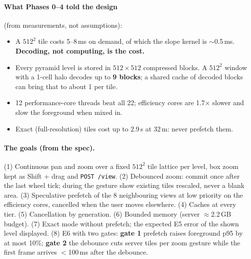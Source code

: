 ﻿\documentclass[11pt,a4paper]{article}
\newcommand{\code}[1]{\texttt{#1}}
\begin{document}
\paragraph{What Phases 0--4 told the design} (from measurements, not assumptions):
\begin{itemize}
  \item A $512^2$ tile costs 5--8\,ms on demand, of which the slope kernel is $\sim$0.5\,ms. \textbf{Decoding, not
  computing, is the cost.}
  \item Every pyramid level is stored in $512\times512$ compressed blocks. A $512^2$ window with a 1-cell halo decodes
  up to \textbf{9 blocks}; a shared cache of decoded blocks can bring that to about 1 per tile.
  \item 12 performance-core threads beat all 22; efficiency cores are 1.7$\times$ slower and slow the foreground when
  mixed in.
  \item Exact (full-resolution) tiles cost up to 2.9\,s at 32\,m: never prefetch them.
\end{itemize}

\paragraph{The goals (from the spec).} (1) Continuous pan and zoom over a fixed $512^2$ tile lattice per level, box
zoom kept as Shift + drag and \code{POST /view}. (2) Debounced zoom: commit once after the last wheel tick; during the
gesture show existing tiles rescaled, never a blank area. (3) Speculative prefetch of the 8 neighbouring views at low
priority on the efficiency cores, cancelled when the user moves elsewhere. (4) Caches at every tier. (5) Cancellation
by generation. (6) Bounded memory (server $\approx$2.2\,GB budget). (7) Exact mode without prefetch; the expected E5
error of the shown level displayed. (8) E6 with two gates: \textbf{gate 1} prefetch raises foreground p95 by at most
10\%; \textbf{gate 2} the debounce cuts server tiles per zoom gesture while the first frame arrives $<$100\,ms after the
debounce.
\end{document}
